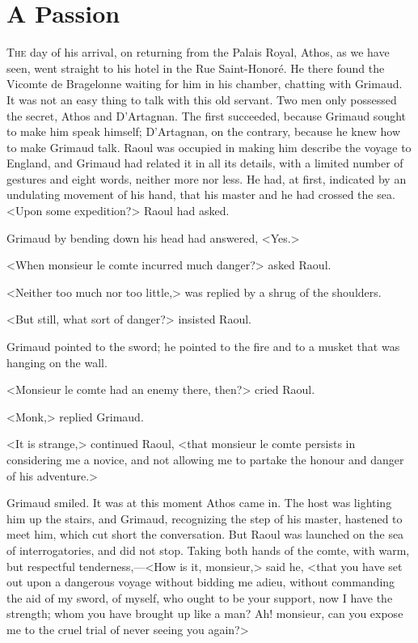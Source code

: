 \chapter{A Passion}

\lettrine{T}{he} day of his arrival, on returning from the Palais Royal, Athos, as we have seen, went straight to his hotel in the Rue Saint-Honoré. He there found the Vicomte de Bragelonne waiting for him in his chamber, chatting with Grimaud. It was not an easy thing to talk with this old servant. Two men only possessed the secret, Athos and D'Artagnan. The first succeeded, because Grimaud sought to make him speak himself; D'Artagnan, on the contrary, because he knew how to make Grimaud talk. Raoul was occupied in making him describe the voyage to England, and Grimaud had related it in all its details, with a limited number of gestures and eight words, neither more nor less. He had, at first, indicated by an undulating movement of his hand, that his master and he had crossed the sea. <Upon some expedition?> Raoul had asked.

Grimaud by bending down his head had answered, <Yes.>

<When monsieur le comte incurred much danger?> asked Raoul.

<Neither too much nor too little,> was replied by a shrug of the shoulders.

<But still, what sort of danger?> insisted Raoul.

Grimaud pointed to the sword; he pointed to the fire and to a musket that was hanging on the wall.

<Monsieur le comte had an enemy there, then?> cried Raoul.

<Monk,> replied Grimaud.

<It is strange,> continued Raoul, <that monsieur le comte persists in considering me a novice, and not allowing me to partake the honour and danger of his adventure.>

Grimaud smiled. It was at this moment Athos came in. The host was lighting him up the stairs, and Grimaud, recognizing the step of his master, hastened to meet him, which cut short the conversation. But Raoul was launched on the sea of interrogatories, and did not stop. Taking both hands of the comte, with warm, but respectful tenderness,—<How is it, monsieur,> said he, <that you have set out upon a dangerous voyage without bidding me adieu, without commanding the aid of my sword, of myself, who ought to be your support, now I have the strength; whom you have brought up like a man? Ah! monsieur, can you expose me to the cruel trial of never seeing you again?>

